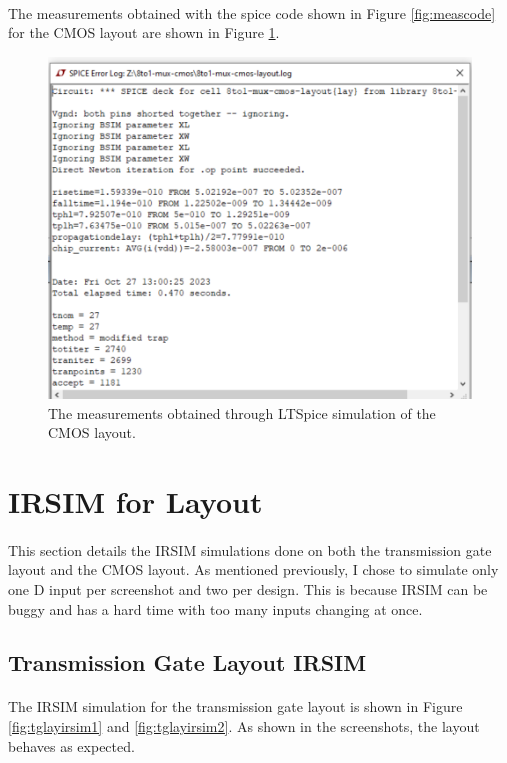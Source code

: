 \documentclass{article}
\begin{document}
    \paragraph{}
    The measurements obtained with the spice code shown in Figure \ref{fig:meascode} for the CMOS layout are shown in Figure \ref{fig:cmoslaymeas}.

    \begin{figure}[H]
      \centering
      \includegraphics[width=0.5\linewidth, frame]{screenshots/cmos/lay/meas.png}
      \caption{The measurements obtained through LTSpice simulation of the CMOS layout.}
      \label{fig:cmoslaymeas}
    \end{figure}



\section{IRSIM for Layout}
  \paragraph{}
  This section details the IRSIM simulations done on both the transmission gate layout and the CMOS layout. As mentioned previously, I chose to simulate only one D input per screenshot and two per design. This is because IRSIM can be buggy and has a hard time with too many inputs changing at once.  

  \subsection{Transmission Gate Layout IRSIM}
    \paragraph{}
    The IRSIM simulation for the transmission gate layout is shown in Figure \ref{fig:tglayirsim1} and \ref{fig:tglayirsim2}. As shown in the screenshots, the layout behaves as expected.
\end{document}
